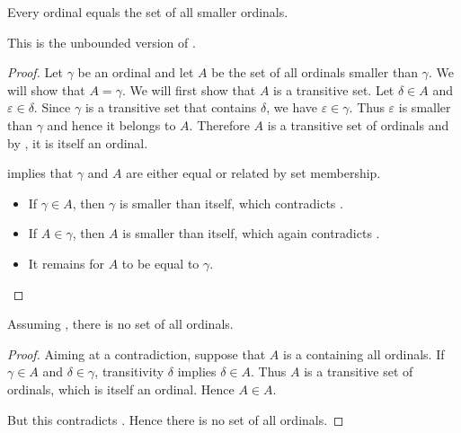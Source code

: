 \begin{proposition}\label{thm:ordinal_is_set_of_smaller_ordinals}
  Every ordinal equals the set of all smaller ordinals.

  This is the unbounded version of .
\end{proposition}
\begin{proof}
  Let \( \gamma \) be an ordinal and let \( A \) be the set of all ordinals smaller than \( \gamma \). We will show that \( A = \gamma \). We will first show that \( A \) is a transitive set. Let \( \delta \in A \) and \( \varepsilon \in \delta \). Since \( \gamma \) is a transitive set that contains \( \delta \), we have \( \varepsilon \in \gamma \). Thus \( \varepsilon \) is smaller than \( \gamma \) and hence it belongs to \( A \). Therefore \( A \) is a transitive set of ordinals and by , it is itself an ordinal.

   implies that \( \gamma \) and \( A \) are either equal or related by set membership.
  \begin{itemize}
    \item If \( \gamma \in A \), then \( \gamma \) is smaller than itself, which contradicts .

    \item If \( A \in \gamma \), then \( A \) is smaller than itself, which again contradicts .

    \item It remains for \( A \) to be equal to \( \gamma \).
  \end{itemize}
\end{proof}

\begin{theorem}\label{thm:burali_forti_paradox}
  Assuming , there is no set of all ordinals.
\end{theorem}
\begin{proof}
  Aiming at a contradiction, suppose that \( A \) is a containing all ordinals. If \( \gamma \in A \) and \( \delta \in \gamma \), transitivity \( \delta \) implies \( \delta \in A \). Thus \( A \) is a transitive set of ordinals, which  is itself an ordinal. Hence \( A \in A \).

  But this contradicts . Hence there is no set of all ordinals.
\end{proof}

